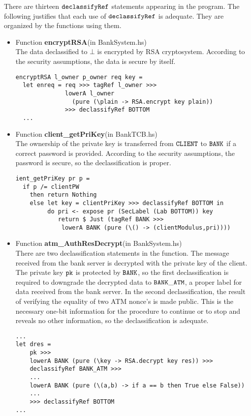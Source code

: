 \documentclass{report}
\newcommand{\co}[1]{$\cod{#1}$}
\begin{document}
There are thirteen \co{declassifyRef} statements appearing in the program. The following justifies that each use 
of \co{declassifyRef} is adequate. They are organized by the functions using them.
\begin{itemize}
\item Function \textbf{encryptRSA}(in BankSystem.hs) \\
      The data declassified to $\bot$ is encrypted by RSA cryptosystem. According to the security
      assumptions, the data is secure by itself.
\begin{Verbatim}[fontsize=\small]
encryptRSA l_owner p_owner req key =
  let enreq = req >>> tagRef l_owner >>> 
              lowerA l_owner 
                (pure (\plain -> RSA.encrypt key plain))
              >>> declassifyRef BOTTOM 
  ...
\end{Verbatim}

\item Function \textbf{client\_getPriKey}(in BankTCB.hs) \\
      The ownership of the private key is transferred from \co{CLIENT} to \co{BANK} if a correct password
      is provided. According to the security assumptions, the password is secure, so the declassification
      is proper.
\begin{Verbatim}[fontsize=\small]
ient_getPriKey pr p =
  if p /= clientPW
    then return Nothing
    else let key = clientPriKey >>> declassifyRef BOTTOM in
         do pri <- expose pr (SecLabel (Lab BOTTOM)) key
            return $ Just (tagRef BANK >>> 
             lowerA BANK (pure (\() -> (clientModulus,pri))))
\end{Verbatim}

\item Function \textbf{atm\_AuthResDecrypt}(in BankSystem.hs) \\
      There are two declassification statements in the function. The message received from the bank server is decrypted with
      the private key of the client. The private key \co{pk} is protected by \co{BANK}, so the first declassification 
      is required to downgrade the decrypted data to \co{BANK\_ATM}, a proper label for data received from the 
      bank server. In the second declassification, the result of verifying the equality of two ATM nonce's is made
      public. This is the necessary one-bit information for the procedure to continue or to stop and reveals no 
      other information, so the declassification is adequate.
\begin{Verbatim}[fontsize=\small]
...
let dres = 
    pk >>>
    lowerA BANK (pure (\key -> RSA.decrypt key res)) >>>
    declassifyRef BANK_ATM >>>
    ...
    lowerA BANK (pure (\(a,b) -> if a == b then True else False))
    ...
    >>> declassifyRef BOTTOM
...
\end{Verbatim}


\end{itemize}
\end{document}
